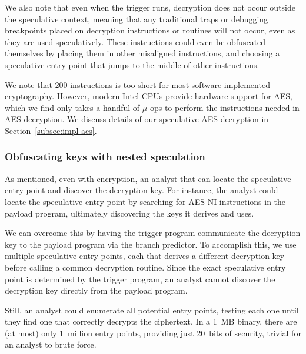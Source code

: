 We also note that even when the trigger runs, decryption does not occur outside
the speculative context, meaning that any traditional traps or debugging
breakpoints placed on decryption instructions or routines will not occur, even
as they are used speculatively. These instructions could even be obfuscated themselves by
placing them in other misaligned instructions, and choosing a speculative entry
point that jumps to the middle of other instructions.


We note that 200 instructions is too short for most software-implemented
cryptography. However, modern Intel CPUs provide hardware support for AES, which
we find only takes a handful of $\mu$-ops to perform the instructions needed in
AES decryption. We discuss details of our speculative AES decryption in
Section~\ref{subsec:impl-aes}.


\subsubsection{Obfuscating keys with nested speculation}
\label{subsec:nested-spec}


As mentioned, even with encryption, an analyst that can locate the
speculative entry point and discover the decryption key. For instance, the
analyst could locate the speculative entry point by searching for AES-NI
instructions in the payload program, ultimately discovering the keys it derives
and uses.

We can overcome
this by having the trigger program communicate the decryption key to the payload
program via the branch predictor. To accomplish this, we use multiple speculative
entry points, each that derives a
different decryption key before calling a common decryption routine. Since
the exact speculative entry point is determined by the trigger program, an
analyst cannot discover the decryption key directly from the payload program.

Still, an analyst could enumerate all potential entry points, testing each one
until they find one that correctly decrypts the ciphertext. In a 1~MB binary,
there are (at most) only 1~million entry points, providing just 20~bits of
security, trivial for an analyst to brute force.

